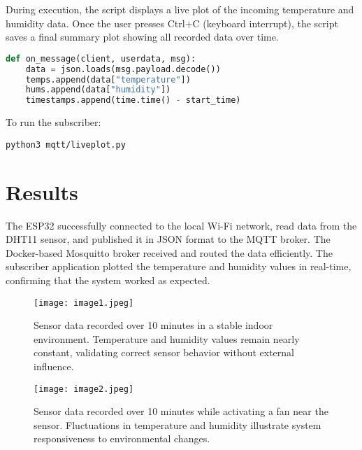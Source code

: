 \documentclass[a4paper,12pt]{article}
\begin{document}
\newpage
\noindent During execution, the script displays a live plot of the incoming temperature and humidity data. Once the user presses Ctrl+C (keyboard interrupt), the script saves a final summary plot showing all recorded data over time.

\begin{lstlisting}[language=Python,caption=MQTT on\_message Callback]
def on_message(client, userdata, msg):
    data = json.loads(msg.payload.decode())
    temps.append(data["temperature"])
    hums.append(data["humidity"])
    timestamps.append(time.time() - start_time)
\end{lstlisting}

To run the subscriber:

\begin{verbatim}
python3 mqtt/liveplot.py
\end{verbatim}


\section{Results}
The ESP32 successfully connected to the local Wi-Fi network, read data from the DHT11 sensor, and published it in JSON format to the MQTT broker. The Docker-based Mosquitto broker received and routed the data efficiently. The subscriber application plotted the temperature and humidity values in real-time, confirming that the system worked as expected.

\begin{figure}[h!]
    \centering
    \texttt{[image: image1.jpeg]}
    \caption{Sensor data recorded over 10 minutes in a stable indoor environment. Temperature and humidity values remain nearly constant, validating correct sensor behavior without external influence.}
    \label{fig:unmodified}
\end{figure}

\begin{figure}[h!]
    \centering
    \texttt{[image: image2.jpeg]}
    \caption{Sensor data recorded over 10 minutes while activating a fan near the sensor. Fluctuations in temperature and humidity illustrate system responsiveness to environmental changes.}
    \label{fig:manipulated}
\end{figure}
\end{document}
